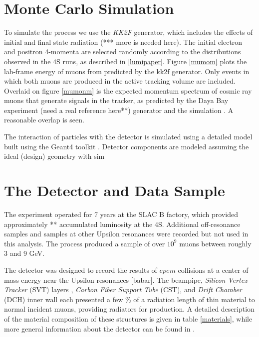 \section{Monte Carlo Simulation}

To simulate the \eetomm process we use the {\em KK2F} \cite{kk2f} generator, which
includes the effects of initial and final state radiation (*** more is needed
here).  The initial electron and positron 4-momenta are selected randomly
according to the distributions observed in the \babar \Y4S runs, as described
in \ref{lumipaper}.  Figure \ref{mumom} plots the lab-frame energy of muons
from  \eetomm predicted by the kk2f generator.  Only events in which both muons
are produced in the active tracking volume are included.  Overlaid on figure
\ref{mumonm} is the expected momentum spectrum of cosmic ray muons that
generate signals in the \mutoe tracker, as predicted
by the Daya Bay experiment (need a real reference here**)
\cite{dayabay} generator and the \mutoe simulation \cite{mutoe}.  A reasonable
overlap is seen.

The interaction of particles with the \babar detector is simulated using a
detailed model built using the Geant4 toolkit \cite{g4}.  Detector components
are modeled assuming the ideal (design) geometry with sim\section{The \babar
Detector and Data Sample}

The \babar experiment operated for 7 years at the SLAC B factory, which
provided approximately ** accumulated luminosity at the \Y4S.  Additional
off-resonance samples and samples at other Upsilon resonances were recorded but
not used in this analysis.  The process \eetomm produced a sample of over
$10^9$ muons between roughly 3 and 9 GeV.

The \babar detector was designed to record the results of $epem$ collisions at
a center of mass energy near the Upsilon resonances [babar].  The \babar
beampipe, {\em Silicon Vertex Tracker} (SVT) layers , {\em Carbon Fiber Support Tube}
(CST), and  {\em Drift Chamber} (DCH) inner wall each presented a few  \% of a
radiation length of thin material to normal incident muons, providing radiators
for \deltaray production.  A detailed description of the material composition
of these structures is given in table \ref{materials}, while more general
information about the \babar detector can be found in \cite{babarnim}.

